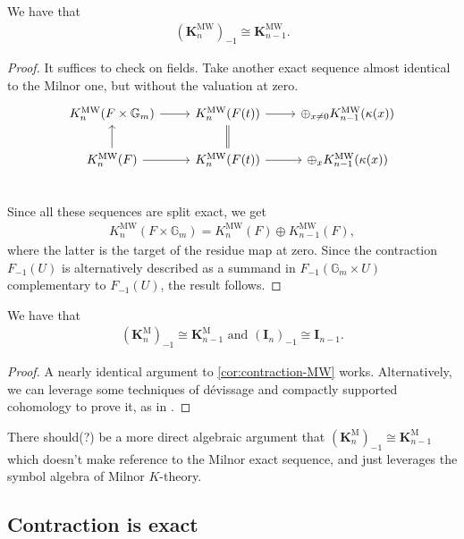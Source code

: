 \documentclass[11pt,openany]{book}
\providecommand{\MW}{\mathrm{MW}}
\providecommand{\KM}{\mathbf{K}^\mathrm{M}}
\providecommand{\KMW}{\mathbf{K}^\mathrm{MW}}
\begin{document}
\begin{corollary}\label{cor:contraction-MW} 
We have that
\begin{align*}
    \left( \KMW_n \right)_{-1} \cong \KMW_{n-1}.
\end{align*}
\end{corollary}
\begin{proof} It suffices to check on fields. Take another exact sequence almost identical to the Milnor one, but without the valuation at zero.
\[ \begin{tikzcd}
    K_n^\MW(F \times \mathbb{G}_m)\rar & K_n^\MW(F(t))\rar & \oplus_{x\ne 0} K_{n-1}^\MW(\kappa(x))\\
    K_n^\MW(F)\uar\rar & K_n^\MW(F(t))\uar[equal]\rar &\oplus_{x} K_{n-1}^\MW(\kappa(x)) \\
\end{tikzcd} \]
Since all these sequences are split exact, we get
\begin{align*}
    K_n^\MW(F \times \mathbb{G}_m) = K_n^\MW(F) \oplus K_{n-1}^\MW(F),
\end{align*}
where the latter is the target of the residue map at zero. Since the contraction $F_{-1}(U)$ is alternatively described as a summand in $F_{-1}(\mathbb{G}_m \times U)$ complementary to $F_{-1}(U)$, the result follows.
\end{proof}

\begin{corollary} We have that
\begin{align*}
    (\KM_n)_{-1} \cong \KM_{n-1} \text{ and } (\mathbf{I}_n)_{-1} \cong \mathbf{I}_{n-1}.
\end{align*}
\end{corollary}
\begin{proof} A nearly identical argument to \autoref{cor:contraction-MW} works. Alternatively, we can leverage some techniques of d\'evissage and compactly supported cohomology to prove it, as in \cite[2.9]{AF-spheres}.
\end{proof}

\begin{note} There should(?) be a more direct algebraic argument that $\left( \KM_n \right)_{-1} \cong \KM_{n-1}$ which doesn't make reference to the Milnor exact sequence, and just leverages the symbol algebra of Milnor $K$-theory.
\end{note}

\subsection{Contraction is exact}
\end{document}

